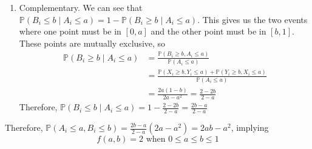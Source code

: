 \begin{solution}
\begin{enumerate}
\begin{center}
				\end{center}
				For $0 \leq a \leq b \leq 1$ its area is $b^2 - (b - a)^2 = 2ab - a^2$, so that $F(a,b) = 2ab - a^2$ and
				\begin{equation}
					\mathbb{P}(B_i \leq b \mid A_i \leq a) = \frac{2ab - a^2}{2a - a^2} = \frac{2b - a}{2 - a}
				\end{equation}

			\item Complementary. We can see that $\mathbb{P}(B_i \leq b \mid A_i \leq a) = 1 - \mathbb{P}(B_i \geq b \mid A_i \leq a)$. This gives us the two events where one point must be in $[0, a]$ and the other point must be in $[b, 1]$. These points are mutually exclusive, so
				\begin{align}
					\mathbb{P}(B_i \geq b \mid A_i \leq a) & = \frac{\mathbb{P}(B_i \geq b,  A_i \leq a)}{\mathbb{P}(A_i \leq a)} \\ 
																								 & = \frac{\mathbb{P}(X_i \geq b, Y_i \leq a) + \mathbb{P}(Y_i \geq b, X_i \leq a)}{\mathbb{P}(A_i \leq a)} \\ 
																								 & = \frac{2a(1 - b)}{2a - a^2} = \frac{2 - 2b}{2 - a}
				\end{align}
				Therefore, $\mathbb{P}(B_i \leq b \mid A_i \leq a) = 1 - \frac{2 - 2b}{2 - a} = \frac{2b - a}{2 - a}$
		\end{enumerate}
		
		Therefore, $\mathbb{P}(A_i \leq a, B_i \leq b) = \frac{2b - a}{2 - a} (2a - a^2) = 2ab - a^2$, implying 
		\begin{equation}
			f(a, b) = 2 \text{ when } 0 \leq a \leq b \leq 1
		\end{equation}


\end{solution}
